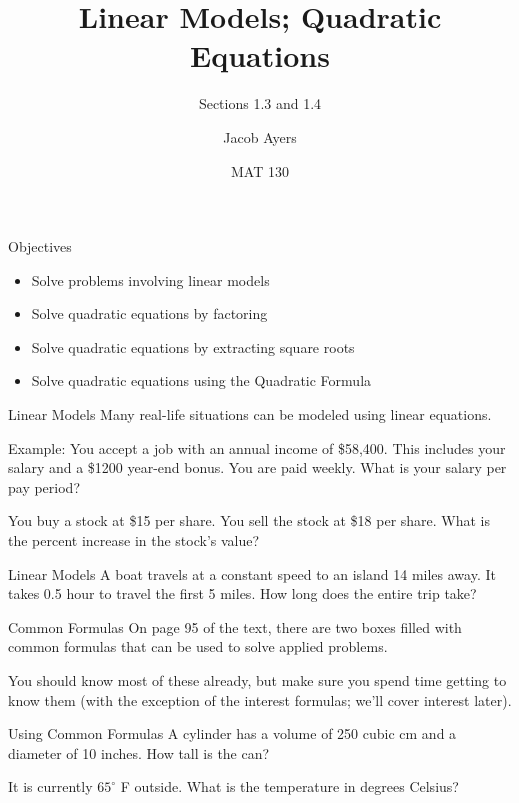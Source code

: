 \documentclass{beamer}
\title[1.3 and 1.4]{Linear Models; Quadratic Equations}
\subtitle{Sections 1.3 and 1.4}
\author{Jacob Ayers}
\institute{Lesson \#5}
\date{MAT 130}
\def\deg{^\circ}
\begin{document}
\begin{frame}
\titlepage
\end{frame}

\begin{frame}[t]{Objectives}
\begin{itemize}
	\item Solve problems involving linear models
	\item Solve quadratic equations by factoring
	\item Solve quadratic equations by extracting square roots
	\item Solve quadratic equations using the Quadratic Formula
\end{itemize}
\end{frame}

\begin{frame}[t]{Linear Models}
Many real-life situations can be modeled using linear equations.

Example: You accept a job with an annual income of \$58,400. This includes your salary and a \$1200 year-end bonus. You are paid weekly. What is your salary per pay period?

\vfill \pause

You buy a stock at \$15 per share. You sell the stock at \$18 per share. What is the percent increase in the stock's value?

\end{frame}

\begin{frame}[t]{Linear Models}
A boat travels at a constant speed to an island 14 miles away. It takes 0.5 hour to travel the first 5 miles. How long does the entire trip take?
\end{frame}

\begin{frame}[t]{Common Formulas}
On page 95 of the text, there are two boxes filled with common formulas that can be used to solve applied problems.

You should know most of these already, but make sure you spend time getting to know them (with the exception of the interest formulas; we'll cover interest later). 
\end{frame}

\begin{frame}[t]{Using Common Formulas}
A cylinder has a volume of 250 cubic cm and a diameter of 10 inches. How tall is the can?

\vfill \pause

It is currently $65\deg$ F outside. What is the temperature in degrees Celsius?

\end{frame}
\end{document}
